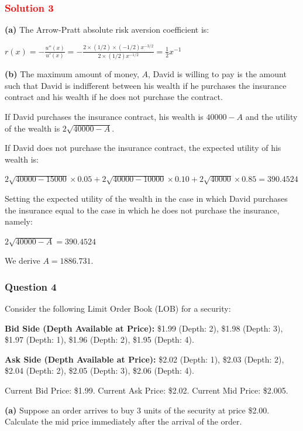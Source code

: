 \subsubsection*{\textcolor{red}{Solution 3}}

\textbf{(a)} The Arrow-Pratt absolute risk aversion coefficient is:

\centerline{$r(x) = -\frac{u''(x)}{u'(x)} = -\frac{2 \times (1/2) \times (-1/2)x^{-3/2}}{2 \times (1/2)x^{-1/2}} = \frac{1}{2}x^{-1}$}

\textbf{(b)} The maximum amount of money, $A$, David is willing to pay is the amount such that David is indifferent between his wealth if he purchases the insurance contract and his wealth if he does not purchase the contract.

If David purchases the insurance contract, his wealth is $40000-A$ and the utility of the wealth is $2\sqrt{40000-A}$.

If David does not purchase the insurance contract, the expected utility of his wealth is:

\centerline{$2\sqrt{40000-15000} \times 0.05 + 2\sqrt{40000-10000} \times 0.10 + 2\sqrt{40000} \times 0.85 = 390.4524$}

Setting the expected utility of the wealth in the case in which David purchases the insurance equal to the case in which he does not purchase the insurance, namely:

\centerline{$2\sqrt{40000-A} = 390.4524$}

We derive $A = 1886.731$.

\subsubsection*{Question 4}

Consider the following Limit Order Book (LOB) for a security:

\textbf{Bid Side (Depth Available at Price):}
\$1.99 (Depth: 2), \$1.98 (Depth: 3), \$1.97 (Depth: 1), \$1.96 (Depth: 2), \$1.95 (Depth: 4).

\textbf{Ask Side (Depth Available at Price):}
\$2.02 (Depth: 1), \$2.03 (Depth: 2), \$2.04 (Depth: 2), \$2.05 (Depth: 3), \$2.06 (Depth: 4).

Current Bid Price: \$1.99. Current Ask Price: \$2.02. Current Mid Price: \$2.005.

\textbf{(a)} Suppose an order arrives to buy 3 units of the security at price \$2.00. Calculate the mid price immediately after the arrival of the order.

